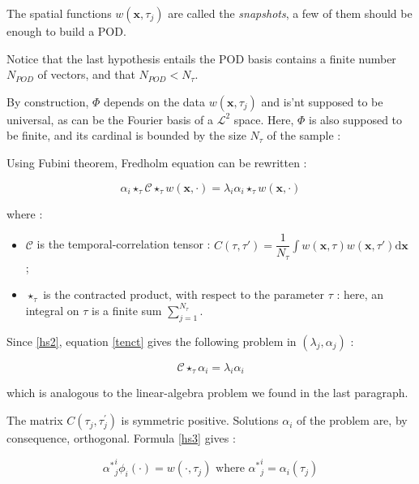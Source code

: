 The spatial functions $w(\mathbf{x}, \tau_j)$ are called the \emph{snapshots}, a few of them should be enough to build a POD.

\par
Notice that the last hypothesis entails the POD basis contains a finite number $N_{POD}$ of vectors, and that $N_{POD}<N_{\tau}$.

\par
By construction, $\Phi$ depends on the data $w(\mathbf{x},\tau_j)$ and is'nt supposed to be universal, as can be the Fourier basis of a $\mathcal{L}^2$ space. %
Here, $\Phi$ is also supposed to be finite, and its cardinal is bounded by the size $N_{\tau}$ of the sample :


Using Fubini theorem, Fredholm equation can be rewritten :

\begin{equation}\label{tenct}
\alpha_i\star_{\tau}\mathcal{C}\star_{\tau}w(\mathbf{x},\cdot)=\lambda_i\alpha_i\star_{\tau}w(\mathbf{x},\cdot)
\end{equation}

where :
\begin{itemize}
\item $\mathcal{C}$ is the temporal-correlation tensor : $\displaystyle C(\tau,\tau ')=\dfrac{1}{N_{\tau}}\int w(\mathbf{x},\tau)w(\mathbf{x},\tau')\text{d}\mathbf{x}$ ;
\item $\star_{\tau}$ is the contracted product, with respect to the parameter $\tau$ : here, an integral on $\tau$ is a finite sum $\sum\limits_{j=1}^{N_{\tau}}$.
\end{itemize}

Since \ref{hs2}, equation \ref{tenct} gives the following problem in $(\lambda_j , \alpha_j)$ :

\begin{equation}\label{tenct}
\mathcal{C}\star_{\tau}\alpha_i\mathbf=\lambda_i\alpha_i
\end{equation}

which is analogous to the linear-algebra problem we found in the last paragraph.

\par
The matrix $C(\tau_j,\tau_j^{'})$ is symmetric positive. Solutions $\alpha_i$ of the problem are, by consequence, %
orthogonal. Formula \ref{hs3} gives :

\[{\alpha^{\ast}}_j^i\phi_i(\cdot )=w(\cdot ,\tau_j)\text{ where ${\alpha^{\ast}}_j^i=\alpha_i(\tau_j)$}\]


